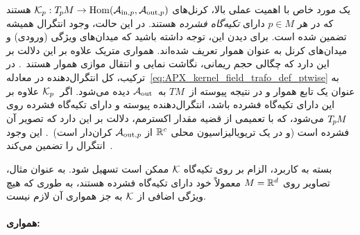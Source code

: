 یک مورد خاص با اهمیت عملی بالا، کرنل‌های $\mathcal{K}_p: T_{\mkern-1.5mu p}\mkern-.5muM \to \operatorname{Hom}(\mathcal{A}_{\textup{in},p},\mathcal{A}_{\textup{out},p})$ هستند که در هر $p\in M$ دارای \emph{تکیه‌گاه فشرده} هستند.
در این حالت، وجود انتگرال همیشه تضمین شده است.
برای دیدن این، توجه داشته باشید که میدان‌های ویژگی (ورودی) و میدان‌های کرنل به عنوان هموار تعریف شده‌اند.
همواری متریک علاوه بر این دلالت بر این دارد که
چگالی حجم ریمانی، نگاشت نمایی و انتقال موازی هموار هستند~\cite{gallier2019diffgeom1}.
در ترکیب، کل انتگرال‌دهنده در معادله~\eqref{eq:APX_kernel_field_trafo_def_ptwise} به عنوان یک تابع هموار و در نتیجه پیوسته از~$TM$ به~$\mathcal{A}_\textup{out}$ دیده می‌شود.
اگر~$\mathcal{K}_p$ علاوه بر این دارای تکیه‌گاه فشرده باشد، انتگرال‌دهنده پیوسته و دارای تکیه‌گاه فشرده روی $T_{\mkern-1.5mu p}\mkern-.5muM$ می‌شود، که با تعمیمی از قضیه مقدار اکسترمم، دلالت بر این دارد که تصویر آن فشرده است (و در یک تریویالیزاسیون محلی $\mathbb{R}^{c}$ از $\mathcal{A}_{\textup{out},p}$ کران‌دار است)~\cite{rudin1976analysis}.
این وجود انتگرال را تضمین می‌کند~\cite{forster2012analysis3,spivak2019calculus}.


بسته به کاربرد، الزام بر روی تکیه‌گاه $\mathcal{K}$ ممکن است تسهیل شود.
به عنوان مثال، تصاویر روی $M=\mathbb{R}^d$ معمولاً خود دارای تکیه‌گاه فشرده هستند، به طوری که هیچ ویژگی اضافی از $\mathcal{K}$ به جز همواری آن لازم نیست.







\paragraph{همواری:}


